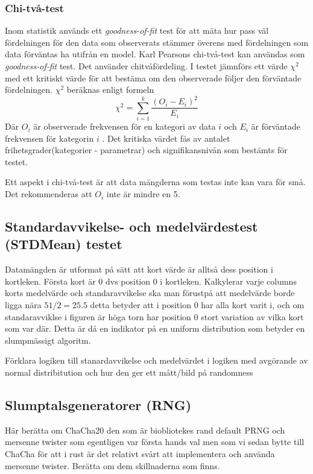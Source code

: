 \documentclass[swedish,a4paper]{article}
\begin{document}
\subsubsection{Chi-två-test}
\label{sec:chi_square}
Inom statistik används ett \textit{goodness-of-fit} test för att mäta
hur pass väl fördelningen för den data som observerats stämmer överens
med fördelningen som data förväntas ha utifrån en model. Karl Pearsons
chi-två-test kan användas som \textit{goodness-of-fit} test. Det
använder chitvåfördeling. I testet jämnförs ett värde $\chi^2$ med ett
kritiskt värde för att bestäma om den observerade följer den förväntade
fördelningen. $\chi^2$ beräknas enligt formeln
$$\chi^2 = \sum_{i=1}^k\frac{(O_i - E_i)^2}{E_i}$$
Där $O_i$ är observerade frekvensen för en kategori av data $i$ och $E_i$
är förväntade frekvensen för kategorin $i$ \parencite{nist}.
Det kritiska värdet fås av antalet frihetsgrader(kategorier - parametrar)
och signifikansnivån som bestämts för testet.

Ett aspekt i chi-två-test är att data mängderna som testas inte kan vara för
små. Det rekommenderas att $O_i$ inte är mindre en 5.

\subsection{Standardavvikelse- och medelvärdestest (STDMean) testet}
\label{sec:stdmean}
Datamängden är utformat på sätt att kort värde är alltså dess position i
kortleken. Första kort är 0 dvs position 0 i kortleken. Kalkylerar varje
columns korts medelvärde och standaravvikelse ska man förustpå att medelvärde
borde ligga nära $51/2= 25.5$ detta betyder att i position 0 har alla kort varit
i, och om standaravviklse i figuren är höga torn har position 0 stort variation
av vilka kort som var där. Detta är då en indikator på en uniform distribution
som betyder en slumpmässigt algoritm.

Förklara logiken till stanardavvikelse och medelvärdet
i logiken med avgörande av normal distribitution och hur den ger ett mått/bild på randomness

\subsection{Slumptalsgeneratorer (RNG)}
\label{sec:prng}
Här berätta om ChaCha20 \parencite{chacha} den som är biobliotekes rand
\parencite{rand_crate} default PRNG och mersenne twister som egentligen var första
hands val
\parencite{mersenne_twister} men som vi sedan bytte till ChaCha för att i rust
är det relativt svårt att  implementera och använda mersenne twister. Berätta om
dem skillnaderna som finns.
\end{document}
